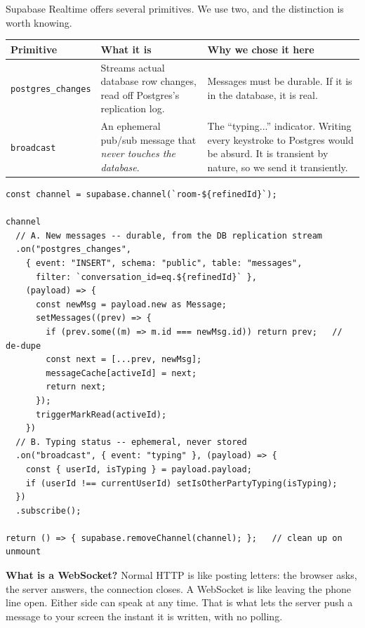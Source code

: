 \documentclass[11pt,a4paper]{article}
\begin{document}
Supabase Realtime offers several primitives. We use two, and the distinction is
worth knowing.

\begin{longtable}{@{}p{3.4cm}p{4.4cm}p{7.0cm}@{}}
\toprule
\textbf{Primitive} & \textbf{What it is} & \textbf{Why we chose it here} \\
\midrule
\endhead
\texttt{postgres\_changes} & Streams actual database row changes, read off
Postgres's replication log. & Messages must be durable. If it is in the
database, it is real. \\
\addlinespace
\texttt{broadcast} & An ephemeral pub/sub message that \emph{never touches the
database}. & The ``typing...'' indicator. Writing every keystroke to Postgres
would be absurd. It is transient by nature, so we send it transiently. \\
\bottomrule
\end{longtable}

\begin{lstlisting}[language=TS,caption={components/messaging/useConversationMessages.ts}]
const channel = supabase.channel(`room-${refinedId}`);

channel
  // A. New messages -- durable, from the DB replication stream
  .on("postgres_changes",
    { event: "INSERT", schema: "public", table: "messages",
      filter: `conversation_id=eq.${refinedId}` },
    (payload) => {
      const newMsg = payload.new as Message;
      setMessages((prev) => {
        if (prev.some((m) => m.id === newMsg.id)) return prev;   // de-dupe
        const next = [...prev, newMsg];
        messageCache[activeId] = next;
        return next;
      });
      triggerMarkRead(activeId);
    })
  // B. Typing status -- ephemeral, never stored
  .on("broadcast", { event: "typing" }, (payload) => {
    const { userId, isTyping } = payload.payload;
    if (userId !== currentUserId) setIsOtherPartyTyping(isTyping);
  })
  .subscribe();

return () => { supabase.removeChannel(channel); };   // clean up on unmount
\end{lstlisting}

\begin{notebox}
\textbf{What is a WebSocket?} Normal HTTP is like posting letters: the browser
asks, the server answers, the connection closes. A WebSocket is like leaving the
phone line open. Either side can speak at any time. That is what lets the server
push a message to your screen the instant it is written, with no polling.
\end{notebox}
\end{document}
